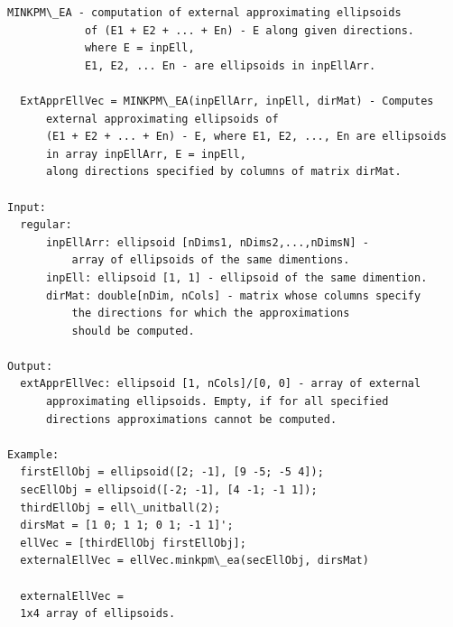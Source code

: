 \documentclass[letterpaper,10pt,english]{sphinxmanual}
\begin{document}
\begin{Verbatim}[commandchars=\\\{\}]
MINKPM\_EA - computation of external approximating ellipsoids
            of (E1 + E2 + ... + En) - E along given directions.
            where E = inpEll,
            E1, E2, ... En - are ellipsoids in inpEllArr.

  ExtApprEllVec = MINKPM\_EA(inpEllArr, inpEll, dirMat) - Computes
      external approximating ellipsoids of
      (E1 + E2 + ... + En) - E, where E1, E2, ..., En are ellipsoids
      in array inpEllArr, E = inpEll,
      along directions specified by columns of matrix dirMat.

Input:
  regular:
      inpEllArr: ellipsoid [nDims1, nDims2,...,nDimsN] -
          array of ellipsoids of the same dimentions.
      inpEll: ellipsoid [1, 1] - ellipsoid of the same dimention.
      dirMat: double[nDim, nCols] - matrix whose columns specify
          the directions for which the approximations
          should be computed.

Output:
  extApprEllVec: ellipsoid [1, nCols]/[0, 0] - array of external
      approximating ellipsoids. Empty, if for all specified
      directions approximations cannot be computed.

Example:
  firstEllObj = ellipsoid([2; -1], [9 -5; -5 4]);
  secEllObj = ellipsoid([-2; -1], [4 -1; -1 1]);
  thirdEllObj = ell\_unitball(2);
  dirsMat = [1 0; 1 1; 0 1; -1 1]';
  ellVec = [thirdEllObj firstEllObj];
  externalEllVec = ellVec.minkpm\_ea(secEllObj, dirsMat)

  externalEllVec =
  1x4 array of ellipsoids.
\end{Verbatim}
\end{document}
